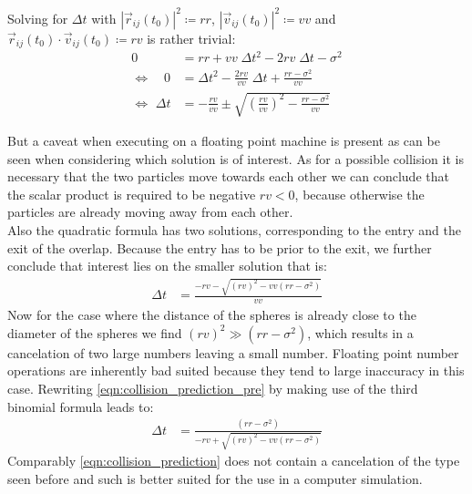 Solving for $\Delta t$ with $|\vec{r}_{ij}(t_0)|^2 \coloneqq rr $, $|\vec{v}_{ij}(t_0)|^2 \coloneqq vv $ and  $\vec{r}_{ij}(t_0) \cdot \vec{v}_{ij}(t_0) \coloneqq rv $ is rather trivial:
\begin{align}
0 &= rr + vv \; \Delta t ^2  - 2 rv \; \Delta t  -\sigma^2\\
\Leftrightarrow \quad 0 &= \Delta t ^2 - \frac{2rv}{vv} \; \Delta t + \frac{rr - \sigma^2 }{vv}\\
\Leftrightarrow \, \, \Delta t &= - \frac{rv}{vv} \pm \sqrt{\left(\frac{rv}{vv}\right)^2 - \frac{rr - \sigma^2 }{vv}}
\end{align}

But a caveat when executing on a floating point machine is present as can be seen when considering which solution is of interest. As for a possible collision it is necessary that the two particles move towards each other we can conclude that the scalar product is required to be negative $rv<0$, because otherwise the particles are already moving away from each other.\\ 

Also the quadratic formula has two solutions, corresponding to the entry and the exit of the overlap. Because the entry has to be prior to the exit, we further conclude that interest lies on the smaller solution that is:
\begin{align}
\label{eqn:collision_prediction_pre}
\Delta t &= \frac{ - rv - \sqrt{ (rv)^2  - vv (rr - \sigma^2 )} }{vv}
\end{align}
Now for the case where the distance of the spheres is already close to the diameter of the spheres we find $(rv)^2 \gg (rr-\sigma^2)$, which results in a cancelation of two large numbers leaving a small number. Floating point number operations are inherently bad suited because they tend to large inaccuracy in this case. Rewriting \autoref{eqn:collision_prediction_pre} by making use of the third binomial formula  leads to:
\begin{align}
\label{eqn:collision_prediction}
\Delta t &= \frac{(rr - \sigma^2 )}{ - rv + \sqrt{ (rv)^2  - vv (rr - \sigma^2 )}}
\end{align}
Comparably \autoref{eqn:collision_prediction} does not contain a cancelation of the type seen before and such is better suited for the use in a computer simulation. \\

